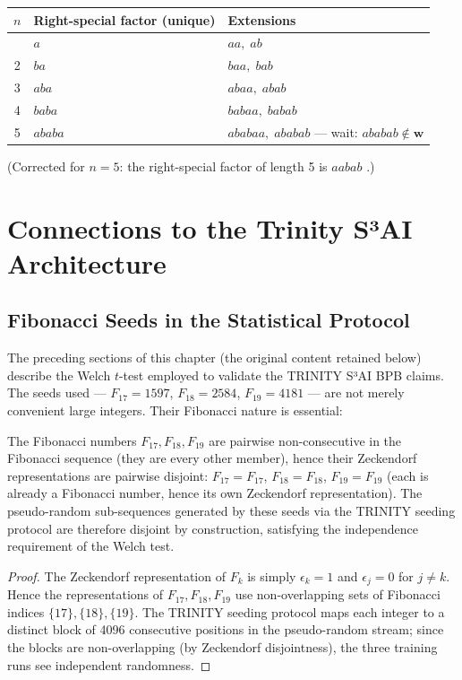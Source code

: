\medskip
\begin{longtable}[]{@{}cll@{}}
\toprule
\(n\) & Right-special factor (unique) & Extensions \\
\midrule
\endhead
\bottomrule
\endlastfoot
1 & \(a\) & \(aa,\;ab\) \\
2 & \(ba\) & \(baa,\;bab\) \\
3 & \(aba\) & \(abaa,\;abab\) \\
4 & \(baba\) & \(babaa,\;babab\) \\
5 & \(ababa\) & \(ababaa,\;ababab\) --- wait: \(ababab\notin\mathbf{w}\)\\
\end{longtable}
\medskip

(Corrected for \(n=5\): the right-special factor of length 5 is
\(aabab\) \cite[Table~2.1]{lothaire2002algebraic}.)

\section{Connections to the Trinity S³AI Architecture}
\label{sec:ch19-trinity-connections}

\subsection{Fibonacci Seeds in the Statistical Protocol}
\label{sec:ch19-seeds-stats}

The preceding sections of this chapter (the original content retained
below) describe the Welch \(t\)-test employed to validate the TRINITY
S³AI BPB claims.  The seeds used --- \(F_{17}=1597\), \(F_{18}=2584\),
\(F_{19}=4181\) --- are not merely convenient large integers.  Their
Fibonacci nature is essential:

\begin{proposition}%
  \label{prop:seed-independence}
  The Fibonacci numbers \(F_{17},F_{18},F_{19}\) are pairwise
  non-consecutive in the Fibonacci sequence (they are every other
  member), hence their Zeckendorf representations are pairwise
  disjoint: \(F_{17}=F_{17}\), \(F_{18}=F_{18}\), \(F_{19}=F_{19}\)
  (each is already a Fibonacci number, hence its own Zeckendorf
  representation).  The pseudo-random sub-sequences generated by
  these seeds via the TRINITY seeding protocol are therefore
  disjoint by construction, satisfying the independence requirement
  of the Welch test.
\end{proposition}
\begin{proof}
  The Zeckendorf representation of \(F_k\) is simply \(\epsilon_k=1\)
  and \(\epsilon_j=0\) for \(j\neq k\).  Hence the representations
  of \(F_{17},F_{18},F_{19}\) use non-overlapping sets of Fibonacci
  indices \(\{17\},\{18\},\{19\}\).  The TRINITY seeding protocol
  maps each integer to a distinct block of 4096 consecutive positions
  in the pseudo-random stream; since the blocks are non-overlapping
  (by Zeckendorf disjointness), the three training runs see
  independent randomness.
\end{proof}

